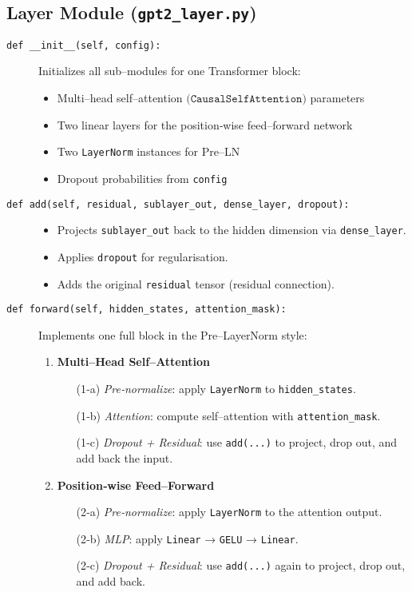 \documentclass{article}
\theoremstyle{definition}
\begin{document}
\subsection{Layer Module (\texttt{gpt2\_layer.py})}

\begin{description}
  \item[\texttt{def \_\_init\_\_(self, config):}] 
    Initializes all sub–modules for one Transformer block:  
    \begin{itemize}
      \item Multi–head self–attention \(\bigl(\texttt{CausalSelfAttention}\bigr)\) parameters  
      \item Two linear layers for the position‐wise feed–forward network  
      \item Two \texttt{LayerNorm} instances for Pre–LN  
      \item Dropout probabilities from \texttt{config}  
    \end{itemize}

  \item[\texttt{def add(self, residual, sublayer\_out, dense\_layer, dropout):}]  
    \begin{itemize}
      \item Projects \texttt{sublayer\_out} back to the hidden dimension via \texttt{dense\_layer}.  
      \item Applies \texttt{dropout} for regularisation.  
      \item Adds the original \texttt{residual} tensor (residual connection).  
    \end{itemize}

  \item[\texttt{def forward(self, hidden\_states, attention\_mask):}]  
    Implements one full block in the Pre–LayerNorm style:
    \begin{enumerate}
      \item \textbf{Multi–Head Self–Attention}
        \begin{enumerate}
          \item[(1‐a)] \emph{Pre‐normalize}: apply \texttt{LayerNorm} to \texttt{hidden\_states}.
          \item[(1‐b)] \emph{Attention}: compute self–attention with \texttt{attention\_mask}.
          \item[(1‐c)] \emph{Dropout + Residual}: use \texttt{add(...)} to project, drop out, and add back the input.
        \end{enumerate}
      \item \textbf{Position‐wise Feed–Forward}
        \begin{enumerate}
          \item[(2‐a)] \emph{Pre‐normalize}: apply \texttt{LayerNorm} to the attention output.
          \item[(2‐b)] \emph{MLP}: apply \texttt{Linear} → \texttt{GELU} → \texttt{Linear}.
          \item[(2‐c)] \emph{Dropout + Residual}: use \texttt{add(...)} again to project, drop out, and add back.
        \end{enumerate}
    \end{enumerate}
\end{description}
\end{document}
